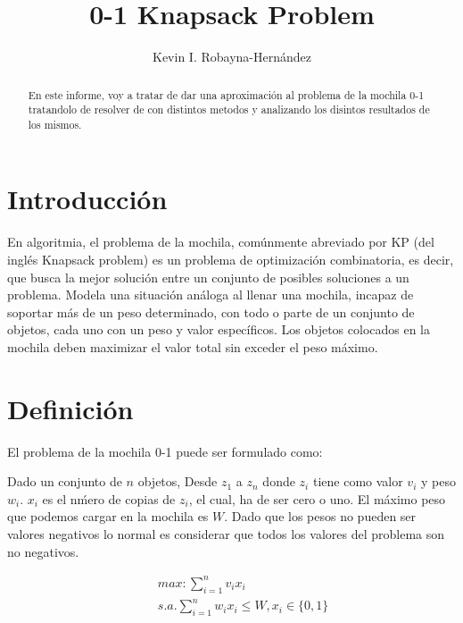 \documentclass[preprint]{elsarticle}
\begin{document}
\begin{frontmatter}

\modulolinenumbers[5]

\title{0-1 Knapsack Problem}

\author{Kevin I. Robayna-Hern\'andez}
\address{Universidad de La Laguna, Espa\~na}

\begin{abstract}
En este informe, voy a tratar de dar una aproximaci\'on al problema de la mochila 0-1 tratandolo de resolver de con distintos metodos y analizando los disintos resultados de los mismos.
\end{abstract}

\end{frontmatter}


\section{Introducci\'on}
En algoritmia, el problema de la mochila, com\'unmente abreviado por KP (del ingl\'es Knapsack problem) es un problema de optimizaci\'on combinatoria, es decir, que busca la mejor soluci\'on entre un conjunto de posibles soluciones a un problema. Modela una situación an\'aloga al llenar una mochila, incapaz de soportar m\'as de un peso determinado, con todo o parte de un conjunto de objetos, cada uno con un peso y valor espec\'ificos. Los objetos colocados en la mochila deben maximizar el valor total sin exceder el peso m\'aximo.

\section{Definici\'on}
El problema de la mochila 0-1 puede ser formulado como:

Dado un conjunto de $n$ objetos, Desde $z_1$ a $z_n$ donde $z_i$ tiene como valor $v_i$ y peso $w_i$. $x_i$ es el n\'mero de copias de $z_i$, el cual, ha de ser cero o uno. El m\'aximo peso que podemos cargar en la mochila es $W$. Dado que los pesos no pueden ser valores negativos lo normal es considerar que todos los valores del problema son no negativos.

\begin{equation}
\begin{split}
&\quad max:\sum_{i=1}^n v_ix_i \\
&\quad s.a.\sum_{i=1}^n w_ix_i \leq W, x_i \in \{0,1\}
\end{split}
\end{equation}
\end{document}
